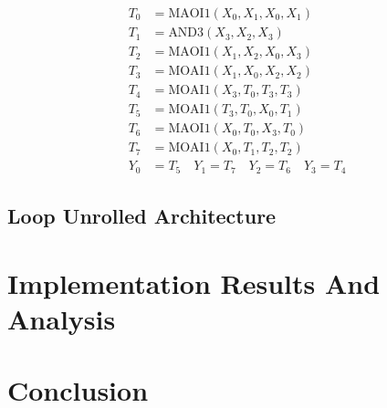 \documentclass[sn-basic]{sn-jnl}%
\begin{document}
\begin{align}
    T_0 &= \text{MAOI1}(X_0, X_1, X_0, X_1) \nonumber \\
    T_1 &= \text{AND3}(X_3, X_2, X_3) \nonumber \\
    T_2 &= \text{MAOI1}(X_1, X_2, X_0, X_3) \nonumber \\
    T_3 &= \text{MOAI1}(X_1, X_0, X_2, X_2) \nonumber \\
    T_4 &= \text{MOAI1}(X_3, T_0, T_3, T_3) \nonumber \\
    T_5 &= \text{MOAI1}(T_3, T_0, X_0, T_1) \nonumber \\
    T_6 &= \text{MAOI1}(X_0, T_0, X_3, T_0) \nonumber \\
    T_7 &= \text{MOAI1}(X_0, T_1, T_2, T_2) \nonumber \\
    Y_0 &= T_5 \quad Y_1 = T_7 \quad Y_2 = T_6 \quad Y_3 = T_4  
     \label{eq2}
\end{align}

\subsection{Loop Unrolled Architecture}\label{subsec3}

\section{Implementation Results And Analysis}\label{sec4}

\section{Conclusion}\label{sec5}

\end{document}
